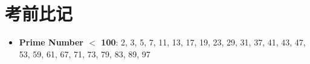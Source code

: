 \appendix
\chapter{考前比记}

\begin{multicols}{3}
  \begin{itemize}
    \item \textbf{Prime Number $ < $ 100}: 2, 3, 5, 7, 11, 13, 17, 19, 23, 29,
    31, 37, 41, 43, 47, 53, 59, 61, 67, 71, 73, 79, 83, 89, 97
  \end{itemize}
\end{multicols}
